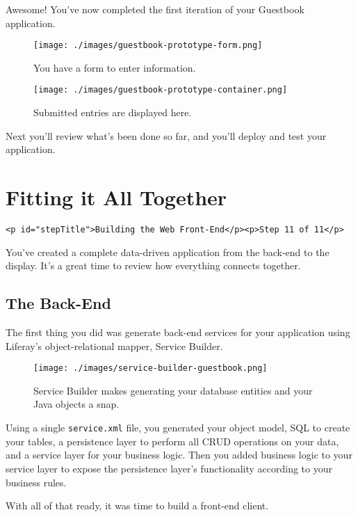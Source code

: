 Awesome! You've now completed the first iteration of your Guestbook
application.

\begin{figure}
\centering
\texttt{[image: ./images/guestbook-prototype-form.png]}
\caption{You have a form to enter information.}
\end{figure}

\begin{figure}
\centering
\texttt{[image: ./images/guestbook-prototype-container.png]}
\caption{Submitted entries are displayed here.}
\end{figure}

Next you'll review what's been done so far, and you'll deploy and test
your application.

\chapter{Fitting it All Together}\label{fitting-it-all-together}

\begin{verbatim}
<p id="stepTitle">Building the Web Front-End</p><p>Step 11 of 11</p>
\end{verbatim}

You've created a complete data-driven application from the back-end to
the display. It's a great time to review how everything connects
together.

\section{The Back-End}\label{the-back-end}

The first thing you did was generate back-end services for your
application using Liferay's object-relational mapper, Service Builder.

\begin{figure}
\centering
\texttt{[image: ./images/service-builder-guestbook.png]}
\caption{Service Builder makes generating your database entities and
your Java objects a snap.}
\end{figure}

Using a single \texttt{service.xml} file, you generated your object
model, SQL to create your tables, a persistence layer to perform all
CRUD operations on your data, and a service layer for your business
logic. Then you added business logic to your service layer to expose the
persistence layer's functionality according to your business rules.

With all of that ready, it was time to build a front-end client.

